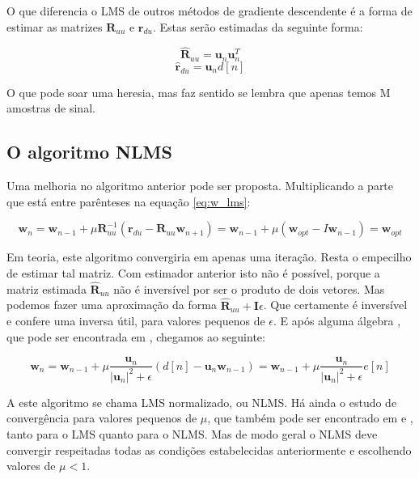 O que diferencia o LMS de outros métodos de gradiente descendente é a forma de estimar as matrizes $\boldsymbol{R}_{uu}$ e $\boldsymbol{r}_{du}$. Estas serão estimadas da seguinte forma:

\begin{equation}
\boldsymbol{\hat{R}}_{uu}=\boldsymbol{u}_n \boldsymbol{u}_{n}^T
\end{equation}
\begin{equation}
\boldsymbol{\hat{r}}_{du}=\boldsymbol{u}_n d[n]
\end{equation}

O que pode soar uma heresia, mas faz sentido se lembra que apenas temos M amostras de sinal.

\subsection{O algoritmo NLMS}

Uma melhoria no algoritmo anterior pode ser proposta. Multiplicando a parte que está entre parênteses na equação \ref{eq:w_lms}:

\begin{equation}
\boldsymbol{w}_{n}=\boldsymbol{w}_{n-1} + \mu \boldsymbol{R}_{uu}^{-1}(\boldsymbol{r}_{du}-\boldsymbol{R}_{uu} \boldsymbol{w}_{n+1}) = \boldsymbol{w}_{n-1} + \mu(\boldsymbol{w}_{opt} - I \boldsymbol{w}_{n-1}) = \boldsymbol{w}_{opt}
\end{equation}

Em teoria, este algoritmo convergiria em apenas uma iteração. Resta o empecilho de estimar tal matriz. Com estimador anterior isto não é possível, porque a matriz estimada $\boldsymbol{\hat{R}}_{uu}$ não é inversível por ser o produto de dois vetores. Mas podemos fazer uma aproximação da forma $\boldsymbol{\hat{R}}_{uu} + \boldsymbol{I} \epsilon$. Que certamente é inversível e confere uma inversa útil, para valores pequenos de $\epsilon$. E após alguma álgebra \cite{bessegato2012line}, que pode ser encontrada em \cite{haykin2005adaptive}, chegamos ao seguinte:

\begin{equation}
\boldsymbol{w}_{n}=\boldsymbol{w}_{n-1} + \mu \frac{\boldsymbol{u}_{n}}{|\boldsymbol{u}_{n}|^2 + \epsilon }(d[n]-\boldsymbol{u}_{n} \boldsymbol{w}_{n-1}) =\boldsymbol{w}_{n-1} + \mu \frac{\boldsymbol{u}_{n}}{|\boldsymbol{u}_{n}|^2 + \epsilon }e[n]
\end{equation}

A este algoritmo se chama LMS normalizado, ou NLMS. Há ainda o estudo de convergência para valores pequenos de $\mu$, que também pode ser encontrado em \cite{diniz1997adaptive} e \cite{haykin2005adaptive}, tanto para o LMS quanto para o NLMS. Mas de modo geral o NLMS deve convergir respeitadas todas as condições estabelecidas anteriormente e escolhendo valores de $\mu<1$.

